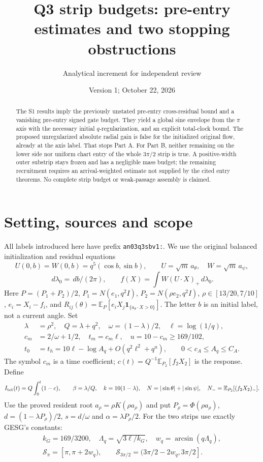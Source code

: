 \documentclass[11pt]{article}
\title{Q3 strip budgets: pre-entry estimates and two stopping obstructions}
\author{Analytical increment for independent review}
\date{Version 1; October 22, 2026}
\numberwithin{equation}{section}
\theoremstyle{remark}\newtheorem{remark}[proposition]{Remark}
\newcommand{\E}{\mathbb E}
\newcommand{\dd}{\,d}
\newcommand{\one}{\mathbf 1}
\newcommand{\Sm}{\mathcal S}
\begin{document}
\maketitle
\begin{abstract}
The S1 results imply the previously unstated pre-entry cross-residual
bound and a vanishing pre-entry signed gate budget. They yield a global
sine envelope from the $\pi$ axis with the necessary initial
$q$-regularization, and an explicit total-clock bound.
The proposed unregularized absolute radial gain is false for the
initialized original flow, already at the axis label. That stops Part A.
For Part B, neither remaining on the lower side nor uniform chart entry
of the whole $3\pi/2$ strip is true. A positive-width outer substrip stays
frozen and has a negligible mass budget; the remaining recruitment
requires an arrival-weighted estimate not supplied by the cited entry
theorems. No complete strip budget or weak-passage assembly is claimed.
\end{abstract}

\section{Setting, sources and scope}
All labels introduced here have prefix \texttt{an03q3sbv1:}.
We use the original balanced initialization and residual equations
\[
 U(0,b)=W(0,b)=q^5(\cos b,\sin b),\qquad
 U=\sqrt m\,a_\theta,\quad W=\sqrt m\,a_\psi,
\]
\[
 \dd\lambda_0=\dd b/(2\pi),\qquad
 f(X)=\int W(U\cdot X)_+\dd\lambda_0 .
\]
Here $P=(P_1+P_2)/2$, $P_1=N(e_1,q^2I)$,
$P_2=N(\rho e_2,q^2I)$, $\rho\in[13/20,7/10]$,
$e_i=X_i-f_i$, and
$R_{ij}(\theta)=\E_P[e_iX_j\one_{\{a_\theta\cdot X>0\}}]$.
The letter $b$ is an initial label, not a current angle.
Set
\begin{align}
 \lambda&=\rho^2,\quad Q=\lambda+q^2,\quad
 \omega=(1-\lambda)/2,\quad \ell=\log(1/q),\nonumber\\
 c_m&=2/\omega+1/2,\quad t_m=c_m\ell,\quad
 u=10-c_m\ge169/102,\nonumber\\
 t_0&=t_h=10\ell-\log A_q+O(q^2\ell^2+q^u),\qquad
 0<c_A\le A_q\le C_A .                         \label{an03q3sbv1:times}
\end{align}
The symbol $c_m$ is a time coefficient; $c(t)=Q^{-1}\E_{P_2}[f_2X_2]$
is the response. Define
\[
 I_{\rm tot}(t)=Q\int_0^t(1-c),\qquad
 \beta=\lambda/Q,\quad k=10(1-\lambda),\quad
 N=|\sin\theta|+|\sin\psi|,\quad
 N_-=\E_{P_2}[(f_2X_2)_-].
\]
Use the proved resident root $a_\rho=\rho K(\rho a_\rho)$ and put
$P_\rho=\Phi(\rho a_\rho)$, $d=(1-\lambda P_\rho)/2$,
$s=d/\omega$ and $\alpha=\lambda P_\rho/2$.
For the two strips use exactly GESG's constants:
\begin{equation}
 \begin{gathered}
 k_G=169/3200,\quad \Lambda_q=\sqrt{3\ell/k_G},\quad
 w_q=\arcsin(q\Lambda_q),\\
 \Sm_\pi=[\pi,\pi+2w_q),\qquad
 \Sm_{3\pi/2}=(3\pi/2-2w_q,3\pi/2].
 \end{gathered}
 \label{an03q3sbv1:strips}
\end{equation}
\end{document}
